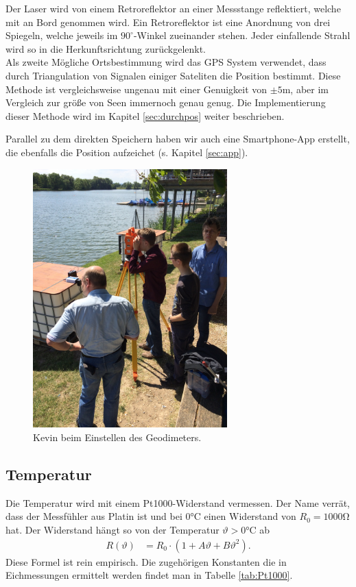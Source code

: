 \documentclass[12pt,a4paper,titlepage,headinclude,bibtotoc]{scrartcl}
\begin{document}
Der Laser wird von einem Retroreflektor an einer Messstange reflektiert, welche mit an Bord genommen wird.
Ein Retroreflektor ist eine Anordnung von drei Spiegeln, welche jeweils im $90^\circ$-Winkel zueinander stehen.
Jeder einfallende Strahl wird so in die Herkunftsrichtung zurückgelenkt.\\
Als zweite Mögliche Ortsbestimmung wird das GPS System verwendet, dass durch Triangulation von Signalen einiger Sateliten die Position bestimmt.
Diese Methode ist vergleichsweise ungenau mit einer Genuigkeit von $\pm5\si{\meter}$, aber im Vergleich zur größe von Seen immernoch genau genug.
Die Implementierung dieser Methode wird im Kapitel \ref{sec:durchpos} weiter beschrieben.

Parallel zu dem direkten Speichern haben wir auch eine Smartphone-App erstellt, die ebenfalls die Position aufzeichet (s. Kapitel \ref{sec:app}).


\begin{figure}[h]
	\centering
	\includegraphics[height=10cm]{Fotos/Geodimeter}
	\caption{Kevin beim Einstellen des Geodimeters.}
	\label{fig:geodimeter}
\end{figure}


\subsection{Temperatur}
Die Temperatur wird mit einem Pt1000-Widerstand vermessen.
Der Name verrät, dass der Messfühler aus Platin ist und bei $0\si{\celsius}$ einen Widerstand von $R_0=1000\si{\ohm}$ hat.
Der Widerstand hängt so von der Temperatur $\vartheta>0\si{\celsius}$ ab
\begin{align}
	R(\vartheta)&=R_0\cdot\left(1 + A\vartheta + B\vartheta^2\right). \label{eq:Pt1000}
\end{align}
Diese Formel ist rein empirisch. 
Die zugehörigen Konstanten die in Eichmessungen ermittelt werden findet man in Tabelle \ref{tab:Pt1000}.
\end{document}

